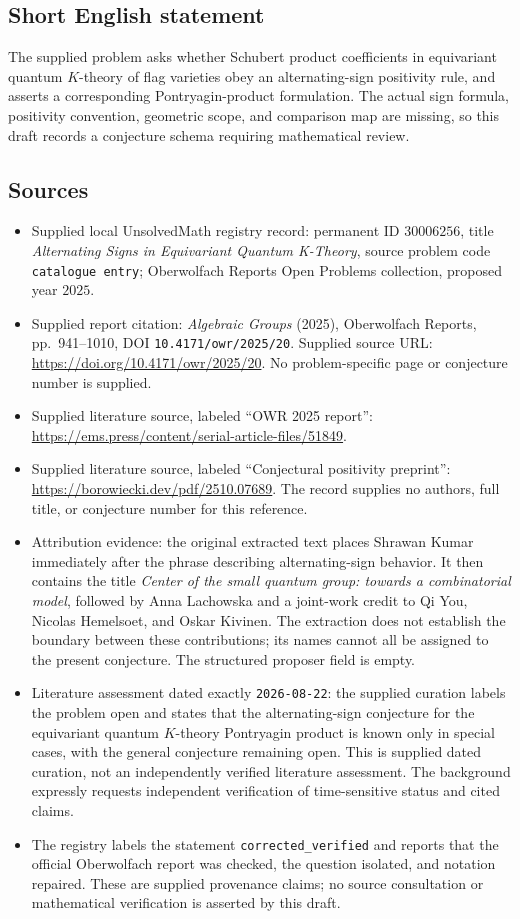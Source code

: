 \documentclass[11pt]{article}
\begin{document}
\subsection{Short English statement}
The supplied problem asks whether Schubert product coefficients in equivariant quantum \(K\)-theory of flag varieties obey an alternating-sign positivity rule, and asserts a corresponding Pontryagin-product formulation. The actual sign formula, positivity convention, geometric scope, and comparison map are missing, so this draft records a conjecture schema requiring mathematical review.
\subsection{Sources}
\begin{itemize}
\item Supplied local UnsolvedMath registry record: permanent ID \(30006256\), title \emph{Alternating Signs in Equivariant Quantum K-Theory}, source problem code \texttt{catalogue entry}; Oberwolfach Reports Open Problems collection, proposed year \(2025\).
\item Supplied report citation: \emph{Algebraic Groups} (2025), Oberwolfach Reports, pp.\ 941--1010, DOI \texttt{10.4171/owr/2025/20}. Supplied source URL: \url{https://doi.org/10.4171/owr/2025/20}. No problem-specific page or conjecture number is supplied.
\item Supplied literature source, labeled ``OWR 2025 report'': \url{https://ems.press/content/serial-article-files/51849}.
\item Supplied literature source, labeled ``Conjectural positivity preprint'': \url{https://borowiecki.dev/pdf/2510.07689}. The record supplies no authors, full title, or conjecture number for this reference.
\item Attribution evidence: the original extracted text places Shrawan Kumar immediately after the phrase describing alternating-sign behavior. It then contains the title \emph{Center of the small quantum group: towards a combinatorial model}, followed by Anna Lachowska and a joint-work credit to Qi You, Nicolas Hemelsoet, and Oskar Kivinen. The extraction does not establish the boundary between these contributions; its names cannot all be assigned to the present conjecture. The structured proposer field is empty.
\item Literature assessment dated exactly \texttt{2026-08-22}: the supplied curation labels the problem open and states that the alternating-sign conjecture for the equivariant quantum \(K\)-theory Pontryagin product is known only in special cases, with the general conjecture remaining open. This is supplied dated curation, not an independently verified literature assessment. The background expressly requests independent verification of time-sensitive status and cited claims.
\item The registry labels the statement \texttt{corrected\_verified} and reports that the official Oberwolfach report was checked, the question isolated, and notation repaired. These are supplied provenance claims; no source consultation or mathematical verification is asserted by this draft.
\end{itemize}
\end{document}
